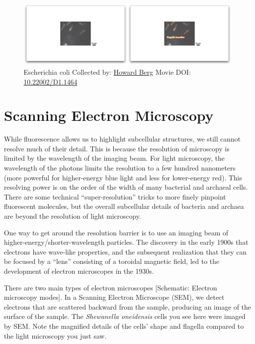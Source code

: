 \documentclass[]{tufte-book}
\begin{document}
\begin{figure}
\includegraphics{movie_stills/1_2} \caption[Escherichia coli Collected by:
\protect\hyperlink{howard_berg}{Howard Berg} Movie DOI:
\href{https://doi.org/10.22002/D1.1464}{10.22002/D1.1464}]{Escherichia coli Collected by:
\protect\hyperlink{howard_berg}{Howard Berg} Movie DOI:
\href{https://doi.org/10.22002/D1.1464}{10.22002/D1.1464}}\label{fig:1-2}
\end{figure}

\section{Scanning Electron
Microscopy}\label{scanning-electron-microscopy}

While fluorescence allows us to highlight subcellular structures, we
still cannot resolve much of their detail. This is because the
resolution of microscopy is limited by the wavelength of the imaging
beam. For light microscopy, the wavelength of the photons limits the
resolution to a few hundred nanometers (more powerful for higher-energy
blue light and less for lower-energy red). This resolving power is on
the order of the width of many bacterial and archaeal cells. There are
some technical ``super-resolution'' tricks to more finely pinpoint
fluorescent molecules, but the overall subcellular details of bacteria
and archaea are beyond the resolution of light microscopy.

One way to get around the resolution barrier is to use an imaging beam
of higher-energy/shorter-wavelength particles. The discovery in the
early 1900s that electrons have wave-like properties, and the subsequent
realization that they can be focused by a ``lens'' consisting of a
toroidal magnetic field, led to the development of electron microscopes
in the 1930s.

There are two main types of electron microscopes {[}Schematic: Electron
microscopy modes{]}. In a Scanning Electron Microscope (SEM), we detect
electrons that are scattered backward from the sample, producing an
image of the surface of the sample. The \emph{Shewanella oneidensis}
cells you see here were imaged by SEM. Note the magnified details of the
cells' shape and flagella compared to the light microscopy you just saw.
\end{document}
